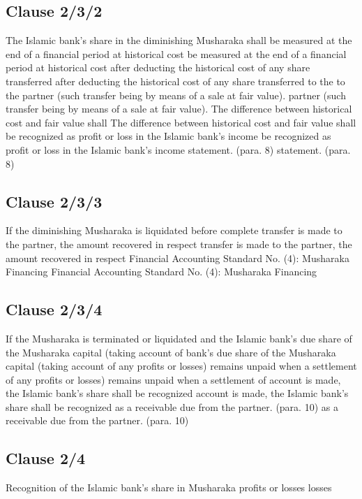 \documentclass{article}%
\begin{document}
%
\subsection{Clause 2/3/2}%
\label{subsec:Clause2/3/2}%
The Islamic bank’s share in the diminishing Musharaka shall  be measured at the end of a financial period at historical cost  be measured at the end of a financial period at historical cost  after deducting the historical cost of any share transferred  after deducting the historical cost of any share transferred to the  to the  partner (such transfer being by means of a sale at fair value).  partner (such transfer being by means of a sale at fair value).  The difference between historical cost and fair value shall  The difference between historical cost and fair value shall  be recognized as profit or loss in the Islamic bank’s income  be recognized as profit or loss in the Islamic bank’s income  statement. (para. 8) statement. (para. 8)

%
\subsection{Clause 2/3/3}%
\label{subsec:Clause2/3/3}%
If the diminishing Musharaka is liquidated before complete  transfer is made to the partner, the amount recovered in respect transfer is made to the partner, the amount recovered in respect  Financial Accounting Standard No. (4): Musharaka Financing Financial Accounting Standard No. (4): Musharaka Financing

%
\subsection{Clause 2/3/4}%
\label{subsec:Clause2/3/4}%
If the Musharaka is terminated or liquidated and the Islamic  bank’s due share of the Musharaka capital (taking account of  bank’s due share of the Musharaka capital (taking account of  any profits or losses) remains unpaid when a settlement of  any profits or losses) remains unpaid when a settlement of  account is made, the Islamic bank’s share shall be recognized  account is made, the Islamic bank’s share shall be recognized  as a receivable due from the partner. (para. 10) as a receivable due from the partner. (para. 10)

%
\subsection{Clause 2/4}%
\label{subsec:Clause2/4}%
Recognition of the Islamic bank’s share in Musharaka profits or  losses losses
\end{document}

